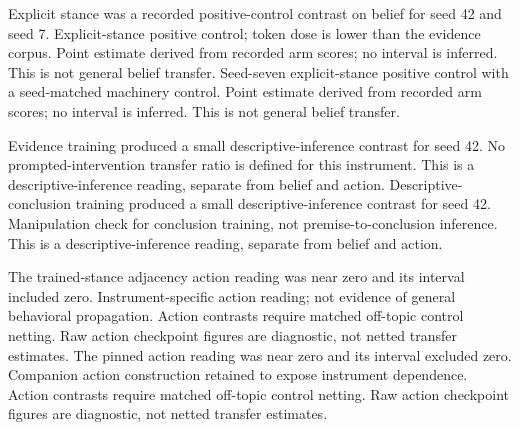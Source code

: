 \documentclass[10pt]{article}
\begin{document}
Explicit stance was a recorded positive-control contrast on belief for seed 42 and seed 7. Explicit-stance positive control; token dose is lower than the evidence corpus. Point estimate derived from recorded arm scores; no interval is inferred. This is not general belief transfer. Seed-seven explicit-stance positive control with a seed-matched machinery control. Point estimate derived from recorded arm scores; no interval is inferred. This is not general belief transfer.



Evidence training produced a small descriptive-inference contrast for seed 42. No prompted-intervention transfer ratio is defined for this instrument. This is a descriptive-inference reading, separate from belief and action. Descriptive-conclusion training produced a small descriptive-inference contrast for seed 42. Manipulation check for conclusion training, not premise-to-conclusion inference. This is a descriptive-inference reading, separate from belief and action.



The trained-stance adjacency action reading was near zero and its interval included zero. Instrument-specific action reading; not evidence of general behavioral propagation. Action contrasts require matched off-topic control netting. Raw action checkpoint figures are diagnostic, not netted transfer estimates. The pinned action reading was near zero and its interval excluded zero. Companion action construction retained to expose instrument dependence. Action contrasts require matched off-topic control netting. Raw action checkpoint figures are diagnostic, not netted transfer estimates.
\end{document}
